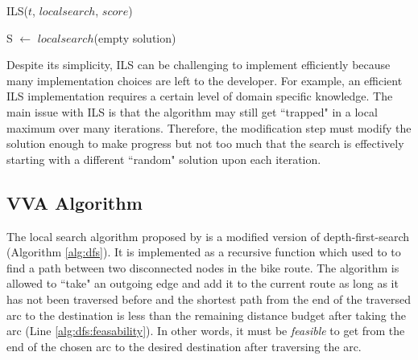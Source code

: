 \documentclass[honors]{union-cs-thesis}
\newcommand{\td}{\todo[inline]}
\begin{document}
%
%
\begin{algorithm}
\caption{ILS($t$, $localsearch$, $score$)}
S $\gets$ $localsearch$(empty solution)\;
\end{algorithm}

Despite its simplicity, ILS can be challenging to implement efficiently because many implementation choices are left to the developer. For example, an efficient ILS implementation requires a certain level of domain specific knowledge. The main issue with ILS is that the algorithm may still get ``trapped" in a local maximum over many iterations. Therefore, the modification step must modify the solution enough to make progress but not too much that the search is effectively starting with a different ``random" solution upon each iteration. 



\subsection{VVA Algorithm}
The local search algorithm proposed by \citeauthor{verbeeck2014extension} is a modified version of depth-first-search (Algorithm \ref{alg:dfs}). It is implemented as a recursive function which used to to find a path between two disconnected nodes in the bike route. The algorithm is allowed to ``take" an outgoing edge and add it to the current route as long as it has not been traversed before and the shortest path from the end of the traversed arc to the destination is less than the remaining distance budget after taking the arc (Line \ref{alg:dfs:feasability}). In other words, it must be \emph{feasible} to get from the end of the chosen arc to the desired destination after traversing the arc. 
\end{document}

